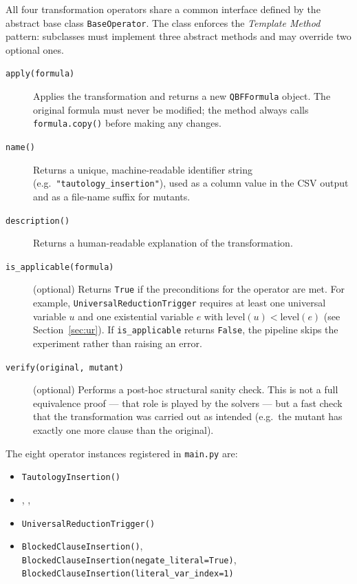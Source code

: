 All four transformation operators share a common interface defined by the abstract base class \texttt{BaseOperator}. The class enforces the \emph{Template Method} pattern: subclasses must implement three abstract methods and may override two optional ones.

\begin{description}
  \item[\texttt{apply(formula)}] Applies the transformation and returns a new \texttt{QBFFormula} object. The original formula must never be modified; the method always calls \texttt{formula.copy()} before making any changes.
  \item[\texttt{name()}] Returns a unique, machine-readable identifier string (e.g.\ \texttt{"tautology\_insertion"}), used as a column value in the CSV output and as a file-name suffix for mutants.
  \item[\texttt{description()}] Returns a human-readable explanation of the transformation.
  \item[\texttt{is\_applicable(formula)}] (optional) Returns \texttt{True} if the preconditions for the operator are met. For example, \texttt{UniversalReductionTrigger} requires at least one universal variable $u$ and one existential variable $e$ with $\mathrm{level}(u) < \mathrm{level}(e)$ (see Section~\ref{sec:ur}). If \texttt{is\_applicable} returns \texttt{False}, the pipeline skips the experiment rather than raising an error.
  \item[\texttt{verify(original, mutant)}] (optional) Performs a post-hoc structural sanity check. This is not a full equivalence proof --- that role is played by the solvers --- but a fast check that the transformation was carried out as intended (e.g.\ the mutant has exactly one more clause than the original).
\end{description}

The eight operator instances registered in \texttt{main.py} are:

\begin{itemize}
  \item \texttt{TautologyInsertion()}
  \item 
    \texttt{}, 
    \texttt{}, 
    \texttt{}
  \item \texttt{UniversalReductionTrigger()}
  \item \texttt{BlockedClauseInsertion()}, 
    \texttt{BlockedClauseInsertion(negate\_literal=True)}, 
    \texttt{BlockedClauseInsertion(literal\_var\_index=1)}
\end{itemize}


